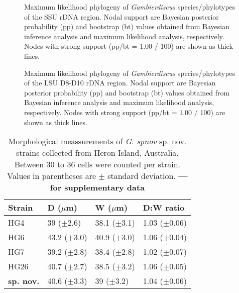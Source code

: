 \documentclass[12pt]{article}
\begin{document}
\FloatBarrier 
\begin{figure} 
\caption{Maximum likelihood phylogeny of \textit{Gambierdiscus} species/phylotypes of the SSU rDNA region. Nodal support are Bayesian posterior probability (pp) and bootstrap (bt) values obtained from Bayesian inference analysis and maximum likelihood analysis, respectively. Nodes with strong support (pp/bt = 1.00 / 100) are shown as thick lines.}
\label{fig:HGSSU} 
\end{figure} 
\FloatBarrier 

\begin{figure} 
\caption{Maximum likelihood phylogeny of \textit{Gambierdiscus} species/phylotypes of the LSU D8-D10 rDNA region. Nodal support are Bayesian posterior probability (pp) and bootstrap (bt) values obtained from Bayesian inference analysis and maximum likelihood analysis, respectively. Nodes with strong support (pp/bt = 1.00 / 100) are shown as thick lines.} 
\label{fig:HGD8D10}
\end{figure} 


\FloatBarrier
\begin{table}
\caption{Morphological meassurements of \emph{G. spnov }sp. nov. strains collected from Heron Island, Australia. Between 30 to 36 cells were counted per strain. Values in parentheses are $\pm$ standard deviation. \textbf{--- for supplementary data}}
\label{tbl:SizeTable}
\begin{tabular}{ | p{2cm} | p{2.5cm} | p{2.5cm} | p{2.5cm} | }
\hline
 \textbf{Strain} & \textbf{D ($\mu$m)} & \textbf{W ($\mu$m)}  & \textbf{D:W ratio}  \\
 \hline
 HG4  & 39 ($\pm$2.6) & 38.1 ($\pm$3.1) & 1.03 ($\pm$0.06) \\

 HG6  & 43.2 ($\pm$3.0) & 40.9 ($\pm$3.0) & 1.06 ($\pm$0.04)  \\

 HG7  & 39.2 ($\pm$2.8) & 38.4 ($\pm$2.8) & 1.02 ($\pm$0.07)  \\

 HG26  & 40.7 ($\pm$2.7) & 38.5 ($\pm$3.2) & 1.06 ($\pm$0.05) \\
  \hline
\textbf{sp. nov.}  & 40.6 ($\pm$3.3) & 39 ($\pm$3.2) & 1.04 ($\pm$0.06) \\
 \hline
\end{tabular}
\end{table}
\FloatBarrier

\newpage


\end{document}
